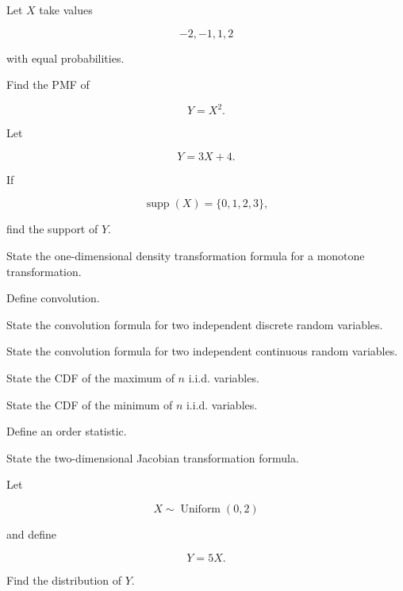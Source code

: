 \begin{exercise}[1]
Let \(X\) take values

\[
-2,-1,1,2
\]

with equal probabilities.

Find the PMF of

\[
Y=X^2.
\]
\end{exercise}

\begin{exercise}[1]
Let

\[
Y=3X+4.
\]

If

\[
\operatorname{supp}(X)=\{0,1,2,3\},
\]

find the support of \(Y\).
\end{exercise}

\begin{exercise}[1]
State the one-dimensional density transformation formula for a
monotone transformation.
\end{exercise}

\begin{exercise}[1]
Define convolution.
\end{exercise}

\begin{exercise}[1]
State the convolution formula for two independent discrete random
variables.
\end{exercise}

\begin{exercise}[1]
State the convolution formula for two independent continuous random
variables.
\end{exercise}

\begin{exercise}[1]
State the CDF of the maximum of \(n\) i.i.d. variables.
\end{exercise}

\begin{exercise}[1]
State the CDF of the minimum of \(n\) i.i.d. variables.
\end{exercise}

\begin{exercise}[1]
Define an order statistic.
\end{exercise}

\begin{exercise}[1]
State the two-dimensional Jacobian transformation formula.
\end{exercise}

\begin{exercise}[2]
Let

\[
X\sim\operatorname{Uniform}(0,2)
\]

and define

\[
Y=5X.
\]

Find the distribution of \(Y\).
\end{exercise}

